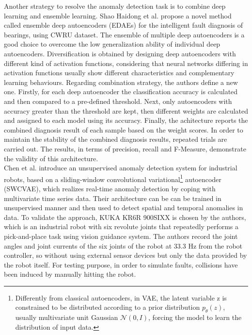Another strategy to resolve the anomaly detection task is to combine deep learning and ensemble learning. Shao Haidong et al. \cite{14NovelMethodEnsembleDeepAutoencoder} propose a novel method called ensemble deep autoencoders (EDAEs) for the intelligent fault diagnosis of bearings, using CWRU dataset. The ensemble of multiple deep autoencoders is a good choice to overcome the low generalization ability of individual deep autoencoders. Diversification is obtained by designing deep autoencoders with different kind of activation functions, considering that neural networks differing in activation functions usually show different characteristics and complementary learning behaviours. Regarding combination strategy, the authors define a new one. Firstly, for each deep autoencoder the classification accuracy is calculated and then compared to a pre-defined threshold. Next, only autoencoders with accuracy greater than the threshold are kept, then different weights are calculated and assigned to each model using its accuracy. Finally, the achitecture reports the combined diagnosis result of each sample based on the weight scores. In order to maintain the stability of the combined diagnosis results, repeated trials are carried out. The results, in terms of precision, recall and F-Measure, demonstrate the validity of this architecture.\\
Chen et al. \cite{21RobotAnomalyDetection} introduce an unsupervised anomaly detection system for industrial robots, based on a sliding-window convolutional variational\footnote{Differently from classical autoencoders, in VAE, the latent variable z is constrained to be distributed according to a prior distribution $p_\theta (z)$, usually multivariate unit Gaussian $\mathcal{N}(0,I)$, forcing the model to learn the distribution of input data.}
autoencoder (SWCVAE), which realizes real-time anomaly detection by coping with multivariate time series data. Their architecture can be can be trained in unsupervised manner and then used to detect spatial and temporal anomalies in data. To validate the approach, KUKA KR6R 900SIXX is chosen by the authors, which is an industrial robot with six revolute joints that repeatedly performs a pick-and-place task using vision guidance system. The authors record the joint angles and joint currents of the six joints of the robot at 33.3 Hz from the robot controller, so without using external sensor devices but only the data provided by the robot itself. For testing purpose, in order to simulate faults, collisions have been induced by manually hitting the robot.

